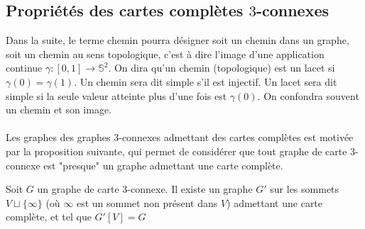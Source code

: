 \documentclass{scrartcl}
\begin{document}
\begin{flushleft}
\section{Propriétés des cartes complètes $3$-connexes}

Dans la suite, le terme chemin pourra désigner soit un chemin dans un graphe, soit un chemin au sens topologique, c'est à dire
l'image d'une application continue $\gamma : [0, 1] \rightarrow \mathbb{S}^2$. On dira qu'un chemin (topologique) est un lacet
si $\gamma(0) = \gamma(1)$. Un chemin sera dit simple s'il est injectif. Un lacet sera dit simple si la seule valeur
atteinte plus d'une fois est $\gamma(0)$. On confondra souvent un chemin et son image.
\\~\\
Les graphes des graphes $3$-connexes admettant des cartes complètes est motivée par la proposition suivante, qui permet
de considérer que tout graphe de carte $3$-connexe est "presque" un graphe admettant une carte complète.

\begin{prop}\label{3connCompl}
    Soit $G$ un graphe de carte $3$-connexe. Il existe un graphe $G'$ sur les sommets $V \sqcup \{\infty\}$ (où $\infty$ est un sommet non
    présent dans $V$) admettant une carte complète, et tel que $G'[V] = G$
\end{prop}


\end{flushleft}
\end{document}
